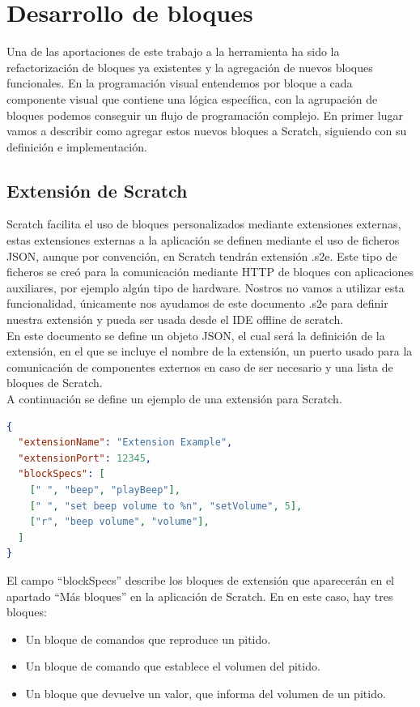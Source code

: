 \section{Desarrollo de bloques}
\label{sec:desarrollo-de-bloques}

Una de las aportaciones de este trabajo a la herramienta ha sido la refactorización de bloques ya existentes y la agregación de nuevos bloques funcionales.
En la programación visual entendemos por bloque a cada componente visual que contiene una lógica específica, con la agrupación de bloques podemos conseguir un flujo de programación complejo. En primer lugar vamos a describir como agregar estos nuevos bloques a Scratch, siguiendo con su definición e implementación.

\subsection{Extensión de Scratch}

Scratch facilita el uso de bloques personalizados mediante extensiones externas, estas  extensiones externas a la aplicación se definen mediante el uso de ficheros JSON, aunque por convención, en Scratch tendrán extensión .s2e. Este tipo de ficheros se creó para la comunicación mediante HTTP de bloques con aplicaciones auxiliares, por ejemplo algún tipo de hardware. Nostros no vamos a utilizar esta funcionalidad, únicamente nos ayudamos de este documento .s2e para definir nuestra extensión y pueda ser usada desde el IDE offline de scratch.\\

En este documento se define un objeto JSON, el cual será la definición de la extensión, en el que se incluye el nombre de la extensión, un puerto usado para la comunicación de componentes externos en caso de ser necesario y una lista de bloques de Scratch. \\

A continuación se define un ejemplo de una extensión para Scratch. 
\begin{lstlisting}[language=json,firstnumber=1]
{ 
  "extensionName": "Extension Example",
  "extensionPort": 12345,
  "blockSpecs": [
    [" ", "beep", "playBeep"],
	[" ", "set beep volume to %n", "setVolume", 5],
	["r", "beep volume", "volume"],
  ]
}
\end{lstlisting}

El campo ``blockSpecs'' describe los bloques de extensión que aparecerán en el apartado ``Más bloques'' en la aplicación de Scratch.
En en este caso, hay tres bloques:
\begin{itemize}
\item Un bloque de comandos que reproduce un pitido.
\item Un bloque de comando que
establece el volumen del pitido.
\item Un bloque que devuelve un valor, que informa del volumen de un pitido.
\end{itemize}

